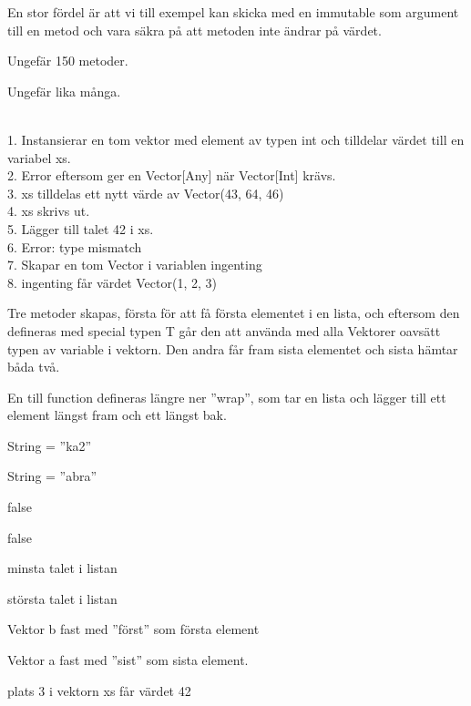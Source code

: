 \Subtask  En stor fördel är att vi till exempel kan skicka med en immutable som argument till en metod och vara säkra på att metoden inte ändrar på värdet.

\Task %

\Subtask  Ungefär 150 metoder.

\Subtask  Ungefär lika många.

\Task %

\Subtask
\\1. Instansierar en tom vektor med element av typen int och tilldelar värdet till en variabel xs.
\\2. Error eftersom  ger en Vector[Any] när Vector[Int] krävs.
\\3. xs tilldelas ett nytt värde av Vector(43, 64, 46)
\\4. xs skrivs ut.
\\5. Lägger till talet 42 i xs.
\\6. Error: type mismatch
\\7. Skapar en tom Vector i variablen ingenting
\\8. ingenting får värdet Vector(1, 2, 3)

\Subtask
Tre metoder skapas, första för att få första elementet i en lista, och eftersom den defineras med special typen T går den att använda med alla Vektorer oavsätt typen av variable i vektorn. Den andra får fram sista elementet och sista hämtar båda två.

En till function defineras längre ner ''wrap'', som tar en lista och lägger till ett element längst fram och ett längst bak.

\Task %

\Subtask  String = ''ka2''

\Subtask  String = ''abra''

\Subtask  false

\Subtask  false



\Subtask  minsta talet i listan

\Subtask  största talet i listan



\Subtask  Vektor b fast med ''först'' som första element

\Subtask  Vektor a fast med ''sist'' som sista element.

\Subtask  plats 3 i vektorn xs får värdet 42

